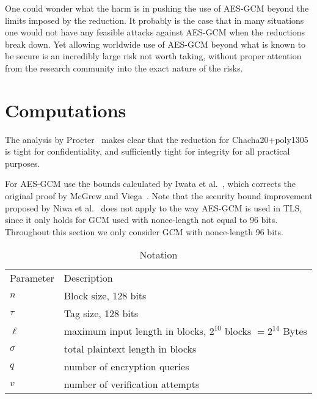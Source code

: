 \documentclass{article}
\begin{document}
One could wonder what the harm is in pushing the use of AES-GCM beyond the limits imposed by the reduction. It probably is the case that in many situations one would not have any feasible attacks against AES-GCM when the reductions break down. Yet allowing worldwide use of AES-GCM beyond what is known to be secure is an incredibly large risk not worth taking, without proper attention from the research community into the exact nature of the risks.

\section{Computations}
The analysis by Procter~\cite{cryptoeprint:2014:613} makes clear that the reduction for Chacha20+poly1305 is tight for confidentiality, and sufficiently tight for integrity for all practical purposes.

For AES-GCM use the bounds calculated by Iwata et al.~\cite{GCMLNCS,cryptoeprint:2012:438}, which corrects the original proof by McGrew and Viega~\cite{DBLP:conf/indocrypt/McGrewV04,DBLP:journals/iacr/McGrewV04}. Note that the security bound improvement proposed by Niwa et al.~\cite{DBLP:conf/fse/NiwaOMI15,DBLP:journals/iacr/NiwaOMI15} does not apply to the way AES-GCM is used in TLS, since it only holds for GCM used with nonce-length not equal to 96 bits. Throughout this section we only consider GCM with nonce-length 96 bits.

\begin{table}[H]
  \centering
  \caption{Notation}\label{table:notation}
  \begin{tabular}{ll}
    \toprule
    Parameter & Description\\
    \cmidrule{1-2}
    $n$ & Block size, 128 bits\\
    $\tau$ & Tag size, 128 bits\\
    $\ell$ & maximum input length in blocks, $2^{10}$ blocks $ = 2^{14}$ Bytes\\
    $\sigma$ & total plaintext length in blocks\\
    $q$ & number of encryption queries\\
    $v$ & number of verification attempts\\
    \bottomrule
  \end{tabular}
\end{table}
\end{document}
